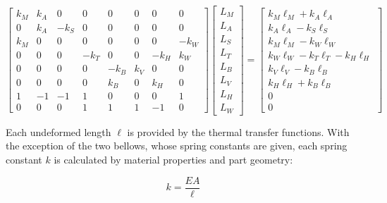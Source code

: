\documentclass[12pt, letterpaper]{report}%
\begin{document}
\begin{appendices}
			\begin{equation}
				\begin{bmatrix}
					k_M & k_A  & 0    & 0     & 0     & 0     & 0     & 0     \\
					0   & k_A  & -k_S & 0     & 0     & 0     & 0     & 0     \\
					k_M & 0    & 0    & 0     & 0     & 0     & 0     & -k_W  \\
					0   & 0    & 0    & -k_T  & 0     & 0     & -k_H  & k_W   \\
					0   & 0    & 0    & 0     & -k_B  & k_V   & 0     & 0     \\
					0   & 0    & 0    & 0     & k_B   & 0     & k_H   & 0     \\
					1   & -1   & -1   & 1     & 0     & 0     & 0     & 1    \\
					0   & 0    & 0    & 1     & 1     & 1     & -1    & 0
				\end{bmatrix}
				\begin{bmatrix}
					L_M \\ L_A \\ L_S \\ L_T \\ L_B \\ L_V \\ L_H \\ L_W
				\end{bmatrix}
				=
				\begin{bmatrix}
					k_M \ell_M + k_A \ell_A \\
					k_A \ell_A - k_S \ell_S \\
					k_M \ell_M - k_W \ell_W \\
					k_W \ell_W - k_T \ell_T - k_H \ell_H \\
					k_V \ell_V - k_B \ell_B \\
					k_H \ell_H + k_B \ell_B \\
					0 \\
					0
				\end{bmatrix}
				\label{eq:app_matrix}
			\end{equation}

			Each undeformed length $\ell$ is provided by the thermal transfer functions. With the exception of the two bellows, whose spring constants are given, each spring constant $k$ is calculated by material properties and part geometry\cite[Eq.~4-2]{ref_Hibbeler}:
			
			\begin{equation}
				k = \frac{EA}{\ell}
				\label{eq:k}
			\end{equation}
			

\end{appendices}
\end{document}
